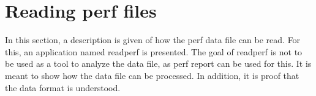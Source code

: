 \section{Reading perf files}
In this section, a description is given of how the perf data file can be read. For this, an application named readperf is presented. The goal of readperf is not to be used as a tool to analyze the data file, as perf report can be used for this. It is meant to show how the data file can be processed. In addition, it is proof that the data format is understood.





